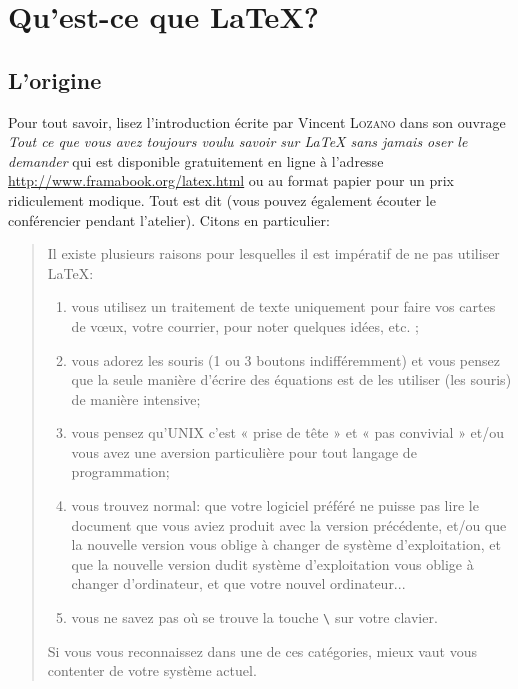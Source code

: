 \chapter{Qu'est-ce que \LaTeX{}?}

\section{L'origine}

Pour tout savoir, lisez l'introduction écrite par Vincent \textsc{Lozano} dans son ouvrage
\textit{Tout ce  que vous avez  toujours voulu  savoir sur {\LaTeX}  sans jamais
  oser le demander}\citep{toutLatex} qui est  disponible gratuitement en ligne à
l'adresse
\href{http://www.framabook.org/latex.html}{http://www.framabook.org/latex.html}
ou au format papier pour un prix ridiculement modique. Tout est dit (vous pouvez également écouter le conférencier
pendant l'atelier). Citons en particulier: 

{\itshape
\begin{quote}
Il existe plusieurs raisons pour lesquelles il est \og impératif\fg{} de ne
pas utiliser \LaTeX{}:
\begin{enumerate}
\item vous utilisez un traitement de texte uniquement pour faire vos
  cartes de v\oe{}ux, votre courrier, pour noter quelques idées, etc.
  ;
\item vous adorez les souris (1 ou 3 boutons indifféremment) et vous
  pensez que la seule manière d'écrire des équations est de les
  utiliser (les souris) de manière intensive;
\item vous pensez qu'UNIX c'est « prise de tête » et « pas
  convivial » et/ou vous avez une aversion particulière pour tout
  langage de programmation;
\item vous trouvez normal: \primo que votre logiciel préféré ne
  puisse pas lire le document que vous aviez produit avec la version
  précédente, et/ou \secundo que la nouvelle version vous oblige à
  changer de système d'exploitation, et \tertio que la nouvelle
  version dudit système d'exploitation vous oblige à changer
  d'ordinateur, et \quarto que votre nouvel ordinateur...
\item vous ne savez pas où se trouve la touche \verb+\+ sur 
  votre clavier. \label{nbraisons}
\end{enumerate}
Si vous vous reconnaissez dans une de ces catégories, mieux vaut vous
contenter de votre système actuel.
\end{quote}
}

